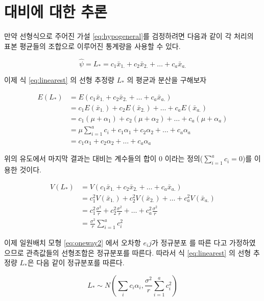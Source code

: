\documentclass[
]{book}
\begin{document}
\hypertarget{uxb300uxbe44uxc5d0-uxb300uxd55c-uxcd94uxb860}{%
\section{대비에 대한 추론}\label{uxb300uxbe44uxc5d0-uxb300uxd55c-uxcd94uxb860}}

만약 선형식으로 주어진 가설 \eqref{eq:hypogeneral}를 검정하려면 다음과 같이 각 처리의 표본 평균들의 조합으로 이루어진 통계량을 사용할 수 있다.

\begin{equation}
\hat \psi = L_* = c_1 \bar x_{1.} + c_2 \bar x_{2.} + \dots + c_a \bar x_{a.}
\label{eq:linearest}
\end{equation}

이제 식 \eqref{eq:linearest} 의 선형 추정량 \(L_*\) 의 평균과 분산을 구해보자

\begin{align*}
E(L_*) & = E ( c_1 \bar x_{1.} + c_2 \bar x_{2.} + \dots + c_a \bar x_{a.} ) \\
  & = c_1 E(\bar x_{1.}) + c_2 E(\bar x_{2.}) + \dots + c_a E(\bar  x_{a.}) \\
  & = c_1 (\mu+ \alpha_1) + c_2 (\mu + \alpha_2) + \dots + c_a  (\mu + \alpha_a) \\
  & = \mu \sum_{i=1}^a c_i + c_1 \alpha_1 + c_2  \alpha_2 + \dots + c_a   \alpha_a \\
  & =  c_1 \alpha_1 + c_2  \alpha_2 + \dots + c_a   \alpha_a 
\end{align*}

위의 유도에서 마지막 결과는 대비는 계수들의 합이 0 이라는 정의(\(\sum_{i=1}^a c_i =0\))를 이용한 것이다.

\begin{align*}
V(L_*) & = V ( c_1 \bar x_{1.} + c_2 \bar x_{2.} + \dots + c_a \bar x_{a.} ) \\
  & = c_1^2 V(\bar x_{1.}) + c_2^2 V(\bar x_{2.}) + \dots + c_a^2 V(\bar  x_{a.}) \\
  & = c_1^2 \frac{\sigma^2}{r} + c_2^2 \frac{\sigma^2}{r} + \dots + c_a^2  \frac{\sigma^2}{r} \\
  & = \frac{\sigma^2}{r} \sum_{i=1}^a c_i^2
\end{align*}

이제 일원배치 모형 \eqref{eq:oneway2} 에서 오차항 \(e_ij\)가 정규분포 를 따른 다고 가정하였으므로 관측값들의 선형조합은 정규분포를 따른다. 따라서 식 \eqref{eq:linearest} 의 선형 추정량 \(L_*\)은 다음 같이 정규분포를 따른다.

\begin{equation}
L_* \sim N \left ( \sum_i c_i \alpha_i, \frac{\sigma^2}{r} \sum_{i=1}^a c_i^2 \right )
\label{eq:lineardist}
\end{equation}
\end{document}
